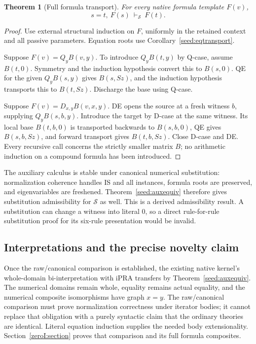 \documentclass[11pt,a4paper]{article}
\newtheorem{theorem}{Theorem}[section]
\theoremstyle{definition}
\begin{document}
\begin{theorem}[Full formula transport]\label{seed:fulltransport}
For every native formula template $F(v)$,
\[
 s=t,\ F(s)\ \vdash_{\mathcal S}\ F(t).
\]
\end{theorem}
\begin{proof}
Use external structural induction on $F$, uniformly in the retained
context and all passive parameters. Equation roots use
Corollary~\ref{seed:eqtransport}.

Suppose $F(v)=Q_yB(v,y)$. To introduce $Q_yB(t,y)$ by Q-case,
assume $B(t,0)$. Symmetry and the induction hypothesis convert this
to $B(s,0)$. QE for the given $Q_yB(s,y)$ gives $B(s,Sz)$,
and the induction hypothesis transports this to $B(t,Sz)$.
Discharge the base using Q-case.

Suppose $F(v)=D_{x,y}B(v,x,y)$. DE opens the source at a fresh
witness $b$, supplying $Q_yB(s,b,y)$. Introduce the target by
D-case at the same witness. Its local base $B(t,b,0)$ is transported
backwards to $B(s,b,0)$, QE gives $B(s,b,Sz)$, and forward transport
gives $B(t,b,Sz)$. Close D-case and DE. Every recursive call concerns
the strictly smaller matrix $B$; no arithmetic induction on a compound
formula has been introduced.
\end{proof}

The auxiliary calculus is stable under canonical numerical substitution:
normalization coherence handles IS and all instances, formula roots are
preserved, and eigenvariables are freshened. Theorem~\ref{seed:auxequiv}
therefore gives substitution admissibility for $\mathcal S$ as well.
This is a derived admissibility result. A substitution can change a
witness into literal $0$, so a direct rule-for-rule substitution proof
for its six-rule presentation would be invalid.

\subsection{Interpretations and the precise novelty claim}

Once the raw/canonical comparison is established, the existing native
kernel's whole-domain bi-interpretation with iPRA transfers by
Theorem~\ref{seed:auxequiv}. The numerical domains remain whole,
equality remains actual equality, and the numerical composite
isomorphisms have graph $x=y$. The raw/canonical comparison must prove
normalization correctness under iterator bodies; it cannot replace that
obligation with a purely syntactic claim that the ordinary theories are
identical. Literal equation induction supplies the needed body
extensionality. Section~\ref{zeroI:section} proves that comparison and its full formula composites.
\end{document}
